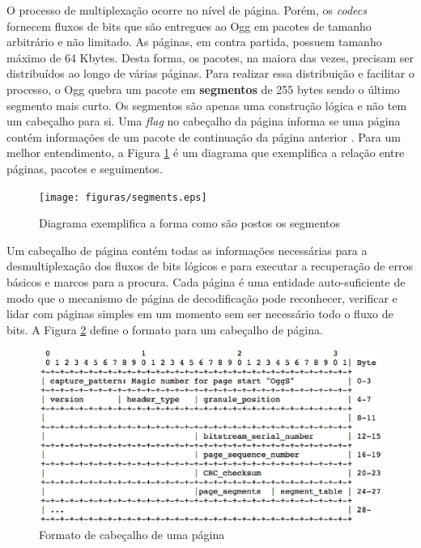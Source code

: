 O processo de multiplexação ocorre no nível de página. Porém, os \textit{codecs} fornecem fluxos de bits que são entregues ao Ogg em pacotes de tamanho arbitrário e não limitado. As páginas, em contra partida, possuem tamanho máximo de 64 Kbytes. Desta forma, os pacotes, na maiora das vezes, precisam ser distribuídos ao longo de várias páginas. Para realizar essa distribuição e facilitar o processo, o Ogg quebra um pacote em \textbf{segmentos} de 255 bytes sendo o último segmento mais curto. Os segmentos são apenas uma construção lógica e não tem um cabeçalho para si. Uma \textit{flag} no cabeçalho da página informa se uma página contém informações de um pacote de continuação da página anterior \cite{ogg}. Para um melhor entendimento, a Figura \ref{segments} é um diagrama que exemplifica a relação entre páginas, pacotes e seguimentos.

\begin{figure}[ht]
	\centering
		\texttt{[image: figuras/segments.eps]}
	\caption{Diagrama exemplifica a forma como são postos os segmentos \cite{ogg}}
	\label{segments}
\end{figure}

Um cabeçalho de página contém todas as informações necessárias para a desmultiplexação dos fluxos de bits lógicos e para executar a recuperação de erros básicos e marcos para a procura. Cada página é uma entidade auto-suficiente de modo que o mecanismo de página de decodificação pode reconhecer, verificar e lidar com páginas simples em um momento sem ser necessário todo o fluxo de bits. A Figura \ref{pageheader} define o formato para um cabeçalho de página.

\begin{figure}[ht]
	\centering
		\includegraphics[keepaspectratio=true,scale=0.6]{figuras/pageheader.eps}
	\caption{Formato de cabeçalho de uma página \cite{ogg}}
	\label{pageheader}
\end{figure}

